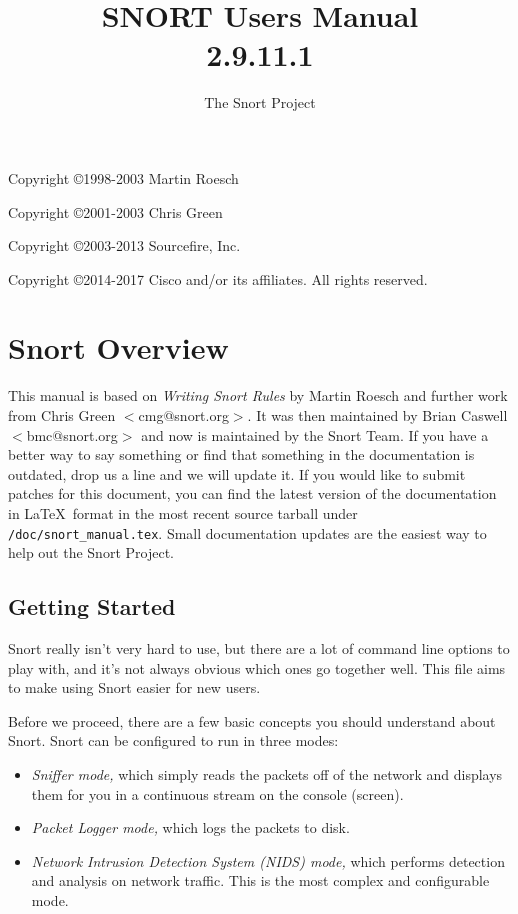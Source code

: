 \documentclass[english]{report}
\begin{document}
\title{SNORT\textsuperscript{\textregistered} Users Manual\\2.9.11.1}

\author{The Snort Project}

\maketitle

\newpage

Copyright \copyright 1998-2003 Martin Roesch

Copyright \copyright 2001-2003 Chris Green

Copyright \copyright 2003-2013 Sourcefire, Inc.

Copyright \copyright 2014-2017 Cisco and/or its affiliates. All rights reserved.

\tableofcontents{}

\chapter{Snort Overview}

This manual is based on \emph{Writing Snort Rules} by Martin Roesch and further
work from Chris Green $<$cmg@snort.org$>$.  It was then maintained by Brian
Caswell $<$bmc@snort.org$>$ and now is maintained by the Snort Team.  If you
have a better way to say something or find that something in the documentation
is outdated, drop us a line and we will update it.  If you would like to submit
patches for this document, you can find the latest version of the documentation
in \LaTeX\ format in the most recent source tarball under
\verb!/doc/snort_manual.tex!.  Small documentation updates are the easiest way
to help out the Snort Project.

\section{Getting Started}

Snort really isn't very hard to use, but there are a lot of command line
options to play with, and it's not always obvious which ones go together well.
This file aims to make using Snort easier for new users.

Before we proceed, there are a few basic concepts you should understand about
Snort. Snort can be configured to run in three modes:

\begin{itemize}

\item {\em Sniffer mode,} which simply reads the packets off of the network and
displays them for you in a continuous stream on the console (screen). 

\item {\em Packet Logger mode,} which logs the packets to disk. 

\item {\em Network Intrusion Detection System (NIDS) mode,} which performs
detection and analysis on network traffic. This is the most complex and
configurable mode.

\end{itemize}
\end{document}
